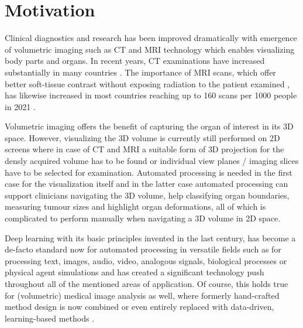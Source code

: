 \section{Motivation} %
    Clinical diagnostics and research has been improved dramatically with emergence of volumetric imaging such as \ac{CT} and \ac{MRI} technology which enables visualizing body parts and organs.
    In recent years, \ac{CT} examinations have increased substantially in many countries \citep{westmark2023increasing, masjedi2020european, martella2023diagnostic}. The importance of \ac{MRI} scans, which offer better soft-tissue contrast without exposing radiation to the patient examined \citep{martella2023diagnostic}, has likewise increased in most countries reaching up to 160 scans per 1000 people in 2021 \citep{statista2021number}. %

    Volumetric imaging offers the benefit of capturing the organ of interest in its \ac{3D} space. However, visualizing the \ac{3D} volume is currently still performed on \ac{2D} screens where in case of \ac{CT} and \ac{MRI} a suitable form of \ac{3D} projection for the densly acquired volume has to be found or individual view planes / imaging slices have to be selected for examination. Automated processing is needed in the first case for the visualization itself and in the latter case automated processing can support clinicians navigating the \ac{3D} volume, help classifying organ boundaries, measuring tumour sizes and highlight organ deformations, all of which is complicated to perform manually when navigating a \ac{3D} volume in \ac{2D} space.

    Deep learning with its basic principles invented in the last century, has become a de-facto standard now for automated processing in versatile fields such as for processing text, images, audio, video, analogous signals, biological processes or physical agent simulations
    \citep{%
        ouyang2022training, %
        kirillov2023segment, %
        birtchnell2018listening,%
        huang2020movienet,%
        sahoo2020machine,%
        jumper2021highly,%
        makoviychuk2021isaac,%
    }
    and has created a significant technology push throughout all of the mentioned areas of application.
    Of course, this holds true for (volumetric) medical image analysis as well, where formerly hand-crafted method design is now combined or even entirely replaced with data-driven, learning-based methods \citep{hosny2018artificial, rajpurkar2022ai}.

